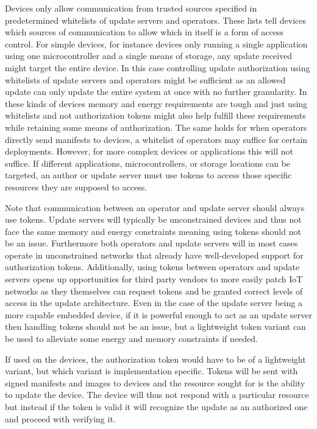 \documentclass[0-thesis.tex]{subfiles}
\begin{document}
Devices only allow communication from trusted sources specified in predetermined
whitelists of update servers and operators. These lists tell devices which sources of
communication to allow which in itself is a form of access control. For simple devices,
for instance devices only running a single application using one microcontroller and a
single means of storage, any update received might target the entire device. In this case
controlling update authorization using whitelists of update servers and operators might be
sufficient as an allowed update can only update the entire system at once with no further
granularity. In these kinds of devices memory and energy requirements are tough and just
using whitelists and not authorization tokens might also help fulfill these requirements
while retaining some means of authorization. The same holds for when operators directly
send manifests to devices, a whitelist of operators may suffice for certain deployments.
However, for more complex devices or applications this will not suffice. If different
applications, microcontrollers, or storage locations can be targeted, an author or update
server must use tokens to access those specific resources they are supposed to access.

Note that communication between an operator and update server should always use tokens.
Update servers will typically be unconstrained devices and thus not face the same memory
and energy constraints meaning using tokens should not be an issue. Furthermore both
operators and update servers will in most cases operate in unconstrained networks that
already have well-developed support for authorization tokens. Additionally, using tokens
between operators and update servers opens up opportunities for third party vendors to
more easily patch IoT networks as they themselves can request tokens and be granted
correct levels of access in the update architecture. Even in the case of the update server
being a more capable embedded device, if it is powerful enough to act as an update server
then handling tokens should not be an issue, but a lightweight token variant can be used
to alleviate some energy and memory constraints if needed.

If used on the devices, the authorization token would have to be of a lightweight variant,
but which variant is implementation specific. Tokens will be sent with signed manifests
and images to devices and the resource sought for is the ability to update the device. The
device will thus not respond with a particular resource but instead if the token is valid
it will recognize the update as an authorized one and proceed with verifying it.
\end{document}
